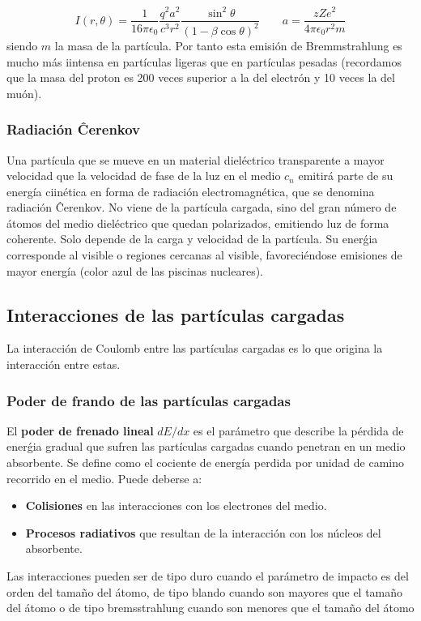 \begin{equation}
    I(r,\theta) = \frac{1}{16 \pi \epsilon_0}  \frac{q^2 a^2}{c^3 r^2} \frac{\sin^2 \theta}{(1-\beta \cos \theta)^2} \qquad a = \frac{zZe^2}{4\pi \epsilon_0 r^2 m} 
 
\end{equation}
siendo $m$ la masa de la partícula. Por tanto esta emisión de Bremmstrahlung es mucho más iintensa en partículas ligeras que en partículas pesadas (recordamos que la masa del proton es 200 veces superior a la del electrón y 10 veces la del muón). 

\subsubsection{Radiación Ĉerenkov}

Una partícula que se mueve en un material dieléctrico transparente a mayor velocidad que la velocidad de fase de la luz en el medio $c_n$ emitirá parte de su energía ciinética en forma de radiación electromagnética, que se denomina radiación Ĉerenkov. No viene de la partícula cargada, sino del gran número de átomos del medio dieléctrico que quedan polarizados, emitiendo luz de forma coherente. Solo depende de la carga y velocidad de la partícula. Su enerǵia corresponde al visible o regiones cercanas al visible, favoreciéndose emisiones de mayor energía (color azul de las piscinas nucleares).

\subsection{Interacciones de las partículas cargadas}


La interacción de Coulomb entre las partículas cargadas es lo que origina la interacción entre estas. 

\subsubsection{Poder de frando de las partículas cargadas}

El \textbf{poder de frenado lineal} $d E / d x$ es el parámetro que describe la pérdida de enerǵia gradual que sufren las partículas cargadas cuando penetran en un medio absorbente. Se define como el cociente de energía perdida por unidad de camino recorrido en el medio. Puede deberse a: 

\begin{itemize}
    \item \textbf{Colisiones} en las interacciones con los electrones del medio.
    \item \textbf{Procesos radiativos} que resultan de la interacción con los núcleos del absorbente. 
\end{itemize}
Las interacciones pueden ser de tipo duro cuando el parámetro de impacto es del orden del tamaño del átomo, de tipo blando cuando son mayores que el tamaño del átomo o de tipo bremsstrahlung cuando son menores que el tamaño del átomo

